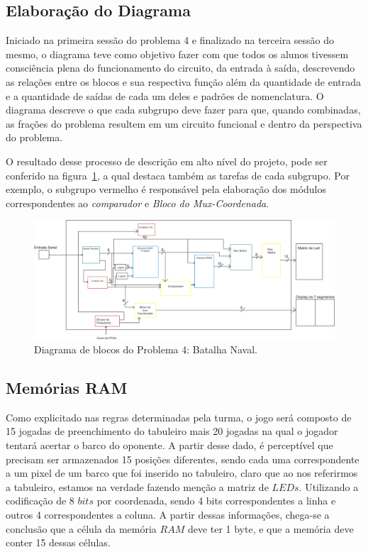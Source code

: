 \documentclass[12pt]{article}
\begin{document}
\subsection{Elaboração do Diagrama}
Iniciado na primeira sessão do problema 4 e finalizado na terceira sessão do mesmo, o diagrama teve como objetivo fazer com que todos os alunos tivessem consciência plena do funcionamento do circuito, da entrada à saída, descrevendo as relações entre os blocos e sua respectiva função além da quantidade de entrada e a quantidade de saídas de cada um deles e padrões de nomenclatura. O diagrama descreve o que cada subgrupo deve fazer para que, quando combinadas, as frações do problema resultem em um circuito funcional e dentro da perspectiva do problema. 

O resultado desse processo de descrição em alto nível do projeto, pode ser conferido na figura~\ref{fig:diagrama}, a qual destaca também as tarefas de cada subgrupo. Por exemplo, o subgrupo vermelho é responsável pela elaboração dos módulos correspondentes ao \textit{comparador} e \textit{Bloco do Mux-Coordenada}.

\begin{figure}[h]
\centering
\includegraphics[width=1\textwidth]{img/diagrama.png}
\caption{Diagrama de blocos do Problema 4: Batalha Naval.}
\label{fig:diagrama}
\end{figure}


\subsection{Memórias RAM}

Como explicitado nas regras determinadas pela turma, o jogo será composto de 15 jogadas de preenchimento do tabuleiro mais 20 jogadas na qual o jogador tentará acertar o barco do oponente. A partir desse dado, é perceptível que precisam ser armazenados 15 posições diferentes, sendo cada uma correspondente a um pixel de um barco que foi inserido no tabuleiro, claro que ao nos referirmos a tabuleiro, estamos na verdade fazendo menção a matriz de $LEDs$. Utilizando a codificação de 8 $bits$ por coordenada, sendo 4 bits correspondentes a linha e outros 4 correspondentes a coluna. A partir dessas informações, chega-se a conclusão que a célula da memória $RAM$ deve ter 1 byte, e que a memória deve conter 15 dessas células.
\end{document}
